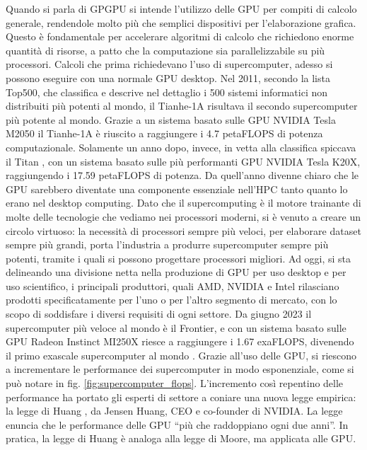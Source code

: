Quando si parla di \gls{GPGPU} si intende l'utilizzo delle \gls{GPU} per compiti di calcolo generale, rendendole molto più che semplici dispositivi per l'elaborazione grafica. Questo è fondamentale per accelerare algoritmi di calcolo che richiedono enorme quantità di risorse, a patto che la computazione sia parallelizzabile su più processori.
Calcoli che prima richiedevano l'uso di supercomputer, adesso si possono eseguire con una normale \gls{GPU} desktop.
Nel 2011, secondo la lista Top500, che classifica e descrive nel dettaglio i 500 sistemi informatici non distribuiti più potenti al mondo, il Tianhe-1A risultava il secondo supercomputer più potente al mondo. Grazie a un sistema basato sulle \gls{GPU} NVIDIA Tesla M2050 \cite[]{Tianhe-1A:link} il Tianhe-1A è riuscito a raggiungere i 4.7 petaFLOPS di potenza computazionale. Solamente un anno dopo, invece, in vetta alla classifica spiccava il Titan \cite[]{Titan:link}, con un sistema basato sulle più performanti \gls{GPU} NVIDIA Tesla K20X, raggiungendo i 17.59 petaFLOPS di potenza.
Da quell'anno divenne chiaro che le \gls{GPU} sarebbero diventate una componente essenziale nell'\gls{HPC} tanto quanto lo erano nel desktop computing. Dato che il supercomputing è il motore trainante di molte delle tecnologie che vediamo nei processori moderni, si è venuto a creare un circolo virtuoso: la necessità di processori sempre più veloci, per elaborare dataset sempre più grandi, porta l'industria a produrre supercomputer sempre più potenti, tramite i quali si possono progettare processori migliori. Ad oggi, si sta delineando una divisione netta nella produzione di \gls{GPU} per uso desktop e per uso scientifico, i principali produttori, quali AMD, NVIDIA e Intel rilasciano prodotti specificatamente per l'uno o per l'altro segmento di mercato, con lo scopo di soddisfare i diversi requisiti di ogni settore. Da giugno 2023 il supercomputer più veloce al mondo è il Frontier, e con un sistema basato sulle \gls{GPU} Radeon Instinct MI250X riesce a raggiungere i 1.67 exaFLOPS, divenendo il primo exascale supercomputer al mondo \cite[]{Frontier:link}. Grazie all'uso delle \gls{GPU}, si riescono a incrementare le performance dei supercomputer in modo esponenziale, come si può notare in fig. \ref{fig:supercomputer_flops}. L'incremento così repentino delle performance ha portato gli esperti di settore a coniare una nuova legge empirica: la legge di Huang \cite[]{Huang:law}, da Jensen Huang, CEO e co-founder di NVIDIA. La legge enuncia che le performance delle \gls{GPU} ``più che raddoppiano ogni due anni''. In pratica, la legge di Huang è analoga alla legge di Moore, ma applicata alle GPU.

